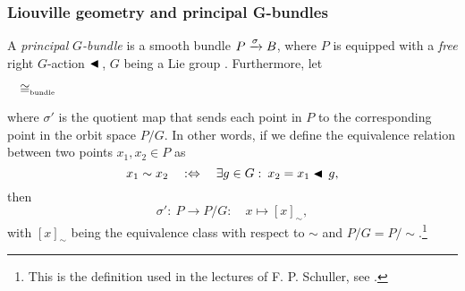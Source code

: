 \subsubsection{Liouville geometry and principal G-bundles}
A \emph{principal} \(G\)\emph{-bundle} is a smooth bundle \(P\xrightarrow[]{\sigma}B\), where \(P\) is equipped with a \emph{free} right \(G\)-action \(\blacktriangleleft\,\), \(G\) being a Lie group \cite{Schuller2014}. Furthermore, let  
\begin{center}
    \(\quad \cong_\text{\tiny bundle} \quad \)
\end{center}
where \(\sigma'\) is the quotient map that sends each point in \(P\) to the corresponding point in the orbit space \(P/G\). In other words, if we define the equivalence relation between two points \(x_1, x_2 \in P\) as
\begin{equation}
     x_1 \sim x_2 \quad :\Leftrightarrow \quad \exists g \in G:\: x_2 = x_1 \blacktriangleleft\,g,
\end{equation}
then 
\begin{equation}
     \sigma':\: P \to P/G:\quad x \mapsto [x]_\sim,
\end{equation}
with \([x]_\sim\) being the equivalence class with respect to \(\sim\) and \(P/G = P/\sim\).\footnote{This is the definition used in the lectures of F. P. Schuller, see \cite{Schuller2014}.}

